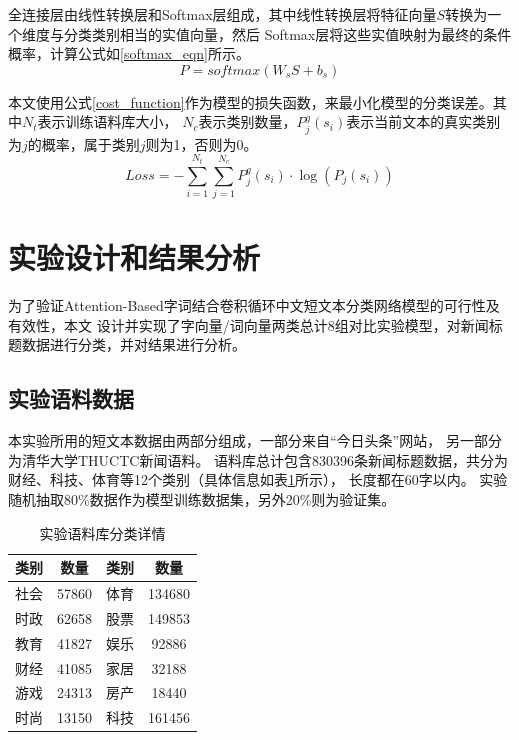 全连接层由线性转换层和Softmax层组成，其中线性转换层将特征向量$S$转换为一个维度与分类类别相当的实值向量，然后
Softmax层将这些实值映射为最终的条件概率，计算公式如\ref{softmax_eqn}所示。
\begin{equation}
    P=softmax\left ( W_sS+b_s \right )
    \label{softmax_eqn}
\end{equation}

本文使用公式\ref{cost_function}作为模型的损失函数，来最小化模型的分类误差。其中$N_t$表示训练语料库大小，
$N_c$表示类别数量，$P_{j}^{g}\left ( s_i \right )$表示当前文本的真实类别为$j$的概率，属于类别$j$则为1，否则为0。
\begin{equation}
    Loss=-\sum_{i=1}^{N_t}\sum_{j=1}^{N_c}P_{j}^{g}\left ( s_i \right )\cdot\log\left ( P_j\left ( s_i \right ) \right )
    \label{cost_function}
\end{equation}
\section{实验设计和结果分析}
为了验证Attention-Based字词结合卷积循环中文短文本分类网络模型的可行性及有效性，本文
设计并实现了字向量/词向量两类总计8组对比实验模型，对新闻标题数据进行分类，并对结果进行分析。
\subsection{实验语料数据}
本实验所用的短文本数据由两部分组成，一部分来自“今日头条”网站，
另一部分为清华大学THUCTC新闻语料。
语料库总计包含830396条新闻标题数据，共分为财经、科技、体育等12个类别（具体信息如表\ref{train_data_table}所示），
长度都在60字以内。
实验随机抽取80\%数据作为模型训练数据集，另外20\%则为验证集。
\begin{table}[h]
    \caption{实验语料库分类详情}
    \begin{tabular}{|c|c|c|c|}
        \hline
        类别 & 数量 & 类别 & 数量 \\
        \hline
        社会 & 57860 & 体育 & 134680 \\
        \hline
        时政 & 62658 & 股票 & 149853 \\
        \hline
        教育 & 41827 & 娱乐 & 92886 \\
        \hline
        财经 & 41085 & 家居 & 32188 \\
        \hline
        游戏 & 24313 & 房产 & 18440 \\
        \hline
        时尚 & 13150 & 科技 & 161456 \\
        \hline
    \end{tabular}
    \label{train_data_table}
    \end{table}

